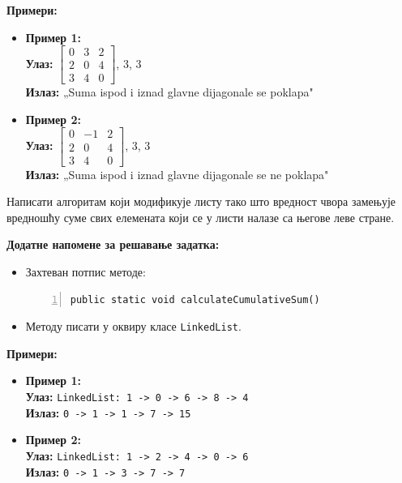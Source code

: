 \textbf{Примери:}
\begin{itemize}
	\item \textbf{Пример 1:} \\
		  \textbf{Улаз:} $\begin{bmatrix} 0 & 3 & 2 \\ 2 & 0 & 4 \\ 3 & 4 & 0 \end{bmatrix}$, 3, 3 \\
		  \textbf{Излаз:} „Suma ispod i iznad glavne dijagonale se poklapa"
	\item \textbf{Пример 2:} \\
		  \textbf{Улаз:} $\begin{bmatrix} 0 & -1 & 2 \\ 2 & 0 & 4 \\ 3 & 4 & 0 \end{bmatrix}$, 3, 3 \\
		  \textbf{Излаз:} „Suma ispod i iznad glavne dijagonale se ne poklapa"
\end{itemize}



Написати алгоритам који модификује листу тако што вредност чвора замењује вредношћу суме свих елемената који се у листи налазе са његове леве стране.

\textbf{Додатне напомене за решавање задатка:}
\begin{itemize}
	\item Захтеван потпис методе:
	\begin{Verbatim}[fontsize=\footnotesize, numbers=left, xleftmargin=10mm]
public static void calculateCumulativeSum()
	\end{Verbatim}
	\item Методу писати у оквиру класе \texttt{LinkedList}.
\end{itemize}

\textbf{Примери:}
\begin{itemize}
	\item \textbf{Пример 1:} \\
		  \textbf{Улаз:} \texttt{LinkedList: 1 -> 0 -> 6 -> 8 -> 4} \\
		  \textbf{Излаз:} \texttt{0 -> 1 -> 1 -> 7 -> 15}
	\item \textbf{Пример 2:} \\
		  \textbf{Улаз:} \texttt{LinkedList: 1 -> 2 -> 4 -> 0 -> 6} \\
		  \textbf{Излаз:} \texttt{0 -> 1 -> 3 -> 7 -> 7}
\end{itemize}



